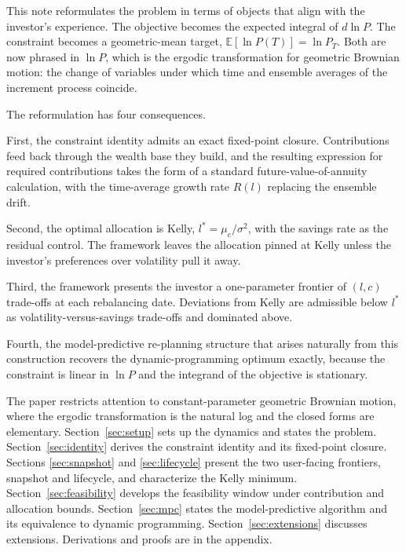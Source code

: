 \documentclass[11pt]{article}
\begin{document}
This note reformulates the problem in terms of objects that align
with the investor's experience. The objective becomes the expected
integral of $d\ln P$. The constraint becomes a geometric-mean target,
$\mathbb{E}[\ln P(T)] = \ln P_T$. Both are now phrased in $\ln P$,
which is the ergodic transformation for geometric Brownian motion:
the change of variables under which time and ensemble averages
of the increment process coincide.

The reformulation has four consequences.

First, the constraint identity admits an exact fixed-point closure.
Contributions feed back through the wealth base they build, and the
resulting expression for required contributions takes the form of a
standard future-value-of-annuity calculation, with the time-average
growth rate $R(l)$ replacing the ensemble drift.

Second, the optimal allocation is Kelly, $l^* = \mu_e/\sigma^2$, with
the savings rate as the residual control. The framework leaves the
allocation pinned at Kelly unless the investor's preferences over
volatility pull it away.

Third, the framework presents the investor a one-parameter frontier
of $(l, c)$ trade-offs at each rebalancing date. Deviations from
Kelly are admissible below $l^*$ as volatility-versus-savings
trade-offs and dominated above.

Fourth, the model-predictive re-planning structure that arises
naturally from this construction recovers the dynamic-programming
optimum exactly, because the constraint is linear in $\ln P$ and the
integrand of the objective is stationary.

The paper restricts attention to constant-parameter geometric
Brownian motion, where the ergodic transformation is the natural log
and the closed forms are elementary. Section~\ref{sec:setup} sets up
the dynamics and states the problem. Section~\ref{sec:identity}
derives the constraint identity and its fixed-point closure. Sections
\ref{sec:snapshot} and \ref{sec:lifecycle} present the two
user-facing frontiers, snapshot and lifecycle, and characterize
the Kelly minimum. Section~\ref{sec:feasibility} develops the
feasibility window under contribution and allocation bounds.
Section~\ref{sec:mpc} states the model-predictive algorithm and its
equivalence to dynamic programming. Section~\ref{sec:extensions}
discusses extensions. Derivations and proofs are in the appendix.

\end{document}
